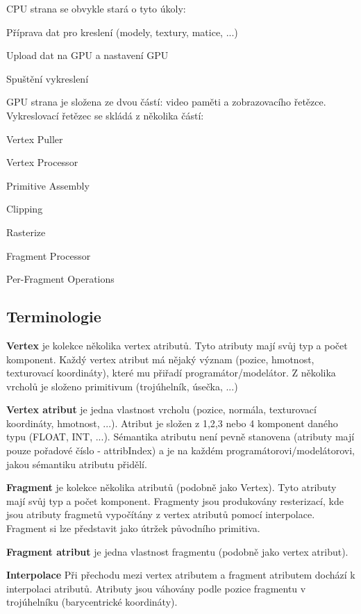 C\+PU strana se obvykle stará o tyto úkoly\+:
\begin{DoxyItemize}
\item Příprava dat pro kreslení (modely, textury, matice, ...)
\item Upload dat na G\+PU a nastavení G\+PU
\item Spuštění vykreslení
\end{DoxyItemize}

G\+PU strana je složena ze dvou částí\+: video paměti a zobrazovacího řetězce. Vykreslovací řetězec se skládá z několika částí\+:
\begin{DoxyItemize}
\item Vertex Puller
\item Vertex Processor
\item Primitive Assembly
\item Clipping
\item Rasterize
\item Fragment Processor
\item Per-\/\+Fragment Operations
\end{DoxyItemize}\hypertarget{index_terminologie}{}\subsection{Terminologie}\label{index_terminologie}
{\bfseries Vertex} je kolekce několika vertex atributů. Tyto atributy mají svůj typ a počet komponent. Každý vertex atribut má nějaký význam (pozice, hmotnost, texturovací koordináty), které mu přiřadí programátor/modelátor. Z několika vrcholů je složeno primitivum (trojúhelník, úsečka, ...)

{\bfseries Vertex atribut} je jedna vlastnost vrcholu (pozice, normála, texturovací koordináty, hmotnost, ...). Atribut je složen z 1,2,3 nebo 4 komponent daného typu (F\+L\+O\+AT, I\+NT, ...). Sémantika atributu není pevně stanovena (atributy mají pouze pořadové číslo -\/ attrib\+Index) a je na každém programátorovi/modelátorovi, jakou sémantiku atributu přidělí. 

{\bfseries Fragment} je kolekce několika atributů (podobně jako Vertex). Tyto atributy mají svůj typ a počet komponent. Fragmenty jsou produkovány resterizací, kde jsou atributy fragmetů vypočítány z vertex atributů pomocí interpolace. Fragment si lze představit jako útržek původního primitiva.

{\bfseries Fragment atribut} je jedna vlastnost fragmentu (podobně jako vertex atribut).

{\bfseries Interpolace} Při přechodu mezi vertex atributem a fragment atributem dochází k interpolaci atributů. Atributy jsou váhovány podle pozice fragmentu v trojúhelníku (barycentrické koordináty). 

